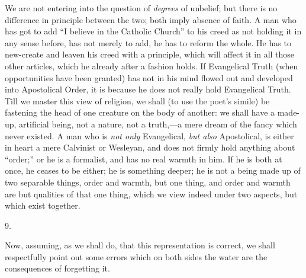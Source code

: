 We are not entering into the question of \emph{degrees}
of unbelief; but there is no difference in principle between the two;
both imply absence of faith. A man who has got to add ``I believe in
the Catholic Church'' to his creed as not holding it in any sense
before, has not merely to add, he has to reform the whole. He has to
new-create and leaven his creed with a principle, which will affect it
in all those other articles, which he already after a fashion holds.
If Evangelical Truth (when opportunities have been granted) has not in
his mind flowed out and developed into Apostolical Order, it is
because he does not really hold Evangelical Truth. Till we master this
view of religion, we shall (to use the poet's simile) be fastening the
head of one creature on the body of another: we shall have a made-up,
artificial being, not a nature, not a truth,—a mere dream of the
fancy which never existed. A man who is \emph{not only} Evangelical, \emph{but
also} Apostolical, is either in heart a mere Calvinist or Wesleyan,
and does not firmly hold anything about ``order;'' or he is a formalist,
and has no real warmth in him. If he is both at once, he ceases to be
either; he is something deeper; he is not a being made up of two
separable things, order and warmth, but one thing, and order and
warmth are but qualities of that one thing, which we view indeed under
two aspects, but which exist together.

9.

Now, assuming, as we shall do, that this
representation is correct, we shall respectfully point out some errors
which on both sides the water are the consequences of forgetting it.


